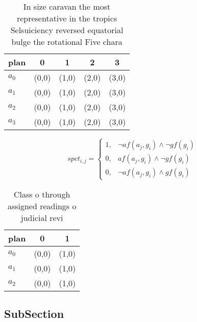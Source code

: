 \documentclass[a4paper]{article}
\begin{document}
\begin{table}
\begin{adjustbox}{width=1\columnwidth}
\begin{tabular}{|l|l|l|l|l|}
\hline
\textbf{plan} & \multicolumn{1}{c|}{\textbf{0}} & \multicolumn{1}{c|}{\textbf{1}} & \multicolumn{1}{c|}{\textbf{2}} & \multicolumn{1}{c|}{\textbf{3}} \\ \hline
\textbf{$a_0$}  & (0,0) & (1,0) & (2,0) & (3,0) \\ \hline
\textbf{$a_1$}  & (0,0) & (1,0) & (2,0) & (3,0) \\ \hline
\textbf{$a_2$}  & (0,0) & (1,0) & (2,0) & (3,0) \\ \hline
\textbf{$a_3$}  & (0,0) & (1,0) & (2,0) & (3,0) \\ \hline
\end{tabular}
\end{adjustbox}
\caption{In size caravan the most representative in the tropics Selsuiciency reversed equatorial bulge the rotational Five chara
}
\end{table}

\begin{equation}
spct_{i,j} =
\begin{cases}
1, & \text{$\neg af(a_j,g_i) \wedge \neg gf(g_i)$}\\
0, & \text{$af(a_j,g_i) \wedge \neg gf(g_i)$}\\
0, & \text{$\neg af(a_j,g_i) \wedge gf(g_i)$}
\end{cases}
\end{equation}

\begin{table}
\begin{adjustbox}{width=0.9\columnwidth}
\begin{tabular}{|l|l|l|}
\hline
\textbf{plan} & \multicolumn{1}{c|}{\textbf{0}} & \multicolumn{1}{c|}{\textbf{1}} \\ \hline
\textbf{$a_0$}  & (0,0) & (1,0) \\ \hline
\textbf{$a_1$}  & (0,0) & (1,0) \\ \hline
\textbf{$a_2$}  & (0,0) & (1,0) \\ \hline
\end{tabular}
\end{adjustbox}
\caption{Class o through assigned readings o judicial revi
}
\end{table}

\subsection{SubSection}
\end{document}
